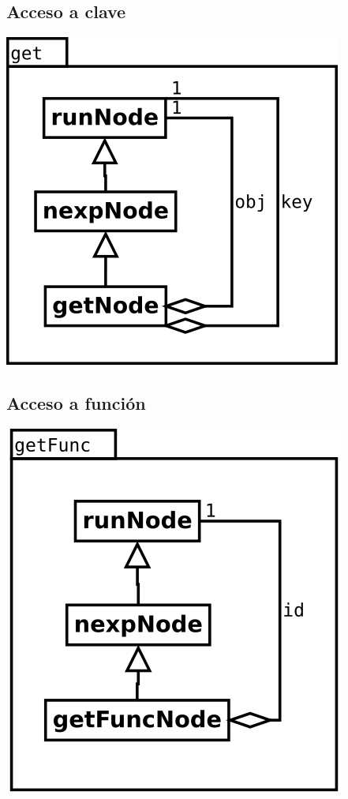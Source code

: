 \subsection {Acceso a clave} 
\begin{center}
\includegraphics[scale=0.4]{get.png} \\
\end{center}

\subsection {Acceso a función} 
\begin{center}
\includegraphics[scale=0.4]{getFunc.png} \\
\end{center}


